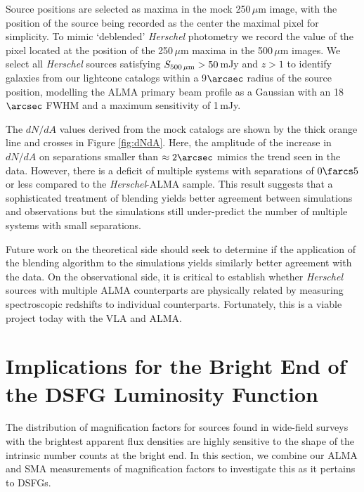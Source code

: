 \documentclass[iop]{emulateapj}
\begin{document}
Source positions are selected as maxima in the mock 250$\,\mu$m image, with the
position of the source being recorded as the center the maximal pixel for
simplicity.  To mimic `deblended' \emph{Herschel} photometry we record the
value of the pixel located at the position of the 250$\,\mu$m maxima in the
500$\,\mu$m images. We select all \emph{Herschel} sources satisfying
$S_{500\,\mu\rm{m}}>50\,$mJy and $z > 1$ to identify galaxies from our
lightcone catalogs within a 9$\arcsec$ radius of the source position, modelling
the ALMA primary beam profile as a Gaussian with an 18$\arcsec$ FWHM and a
maximum sensitivity of 1$\,$mJy.

The $dN/dA$ values derived from the \citet{Cowley:2015lr} mock catalogs are
shown by the thick orange line and crosses in Figure \ref{fig:dNdA}.  Here, the
amplitude of the increase in $dN/dA$ on separations smaller than $\approx
2\arcsec$ mimics the trend seen in the data.  However, there is a deficit of
multiple systems with separations of $0\farcs5$ or less compared to the {\it
Herschel}-ALMA sample.  This result suggests that a sophisticated treatment of
blending yields better agreement between simulations and observations but the
simulations still under-predict the number of multiple systems with small
separations.

Future work on the theoretical side should seek to determine if the application
of the \citet{Cowley:2015lr} blending algorithm to the \citet{HB13} simulations
yields similarly better agreement with the data.  On the observational side, it
is critical to establish whether {\it Herschel} sources with multiple ALMA
counterparts are physically related by measuring spectroscopic redshifts to
individual counterparts.  Fortunately, this is a viable project today with the
VLA and ALMA.

\section{Implications for the Bright End of the DSFG Luminosity
Function}\label{sec:discuss}

The distribution of magnification factors for sources found in wide-field
surveys with the brightest apparent flux densities are highly sensitive to the
shape of the intrinsic number counts at the bright end.  In this section,
we combine our ALMA and SMA measurements of magnification factors to investigate
this as it pertains to DSFGs.
\end{document}
